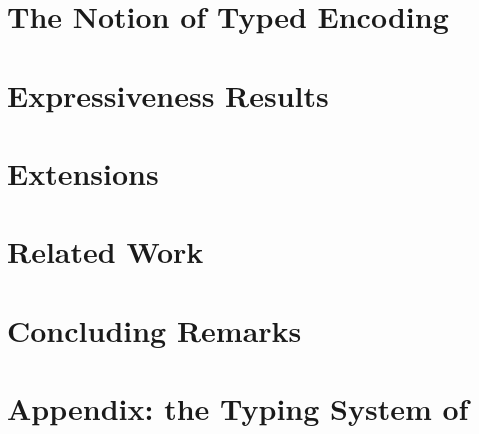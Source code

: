 \documentclass[runningheads]{llncs}
\begin{document}



%



\section{The Notion of Typed Encoding}
\label{s:expr}


\section{Expressiveness Results}
\label{sec:positive}


\section{Extensions}
\label{sec:extension}




%

\section{Related Work}
\label{sec:relwork}


\section{Concluding Remarks}
\label{sec:concl}



%

{}


\newpage
\onecolumn
\setcounter{tocdepth}{4}
\tableofcontents

\appendix 
\section{Appendix: the Typing System of \HOp}
\label{app:types}

%



\end{document}

